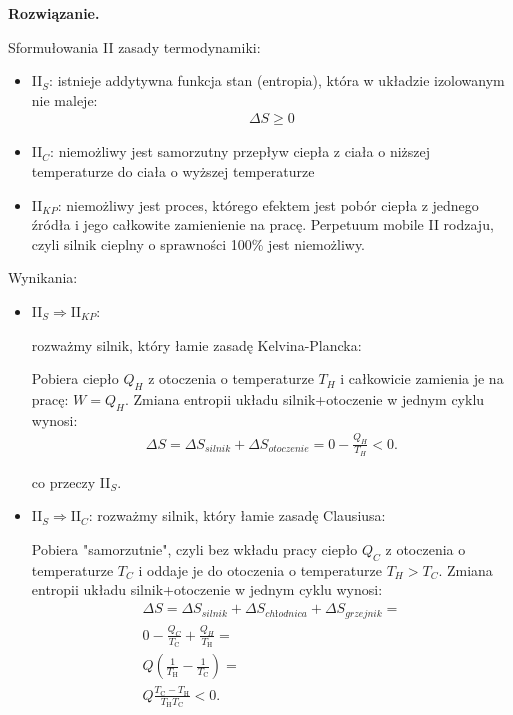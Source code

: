 \documentclass[11pt,a4paper]{article}
\newenvironment{solution}{\vspace{1cm} \par\textbf{Rozwiązanie.} \vspace{1cm}}{}
\begin{document}
\begin{solution}

  Sformułowania II zasady termodynamiki:
\begin{itemize}
  \item II$_{S}$: istnieje addytywna funkcja stan (entropia), 
  która w układzie izolowanym nie maleje:
  \begin{align*}
    \Delta S \geq 0
  \end{align*}
  \item II$_{C}$: niemożliwy jest samorzutny przepływ ciepła 
  z ciała o niższej temperaturze do ciała o wyższej temperaturze
  \item II$_{KP}$: niemożliwy jest proces, którego
      efektem jest pobór ciepła z jednego źródła i jego 
      całkowite zamienienie na pracę. Perpetuum mobile II rodzaju, 
      czyli silnik cieplny o sprawności 100\% jest niemożliwy.
\end{itemize}

\vskip 0.5cm
Wynikania:

\begin{itemize}
  \item II$_{S} \Rightarrow \text{II}_{KP}$:
  
  rozważmy silnik, który łamie zasadę Kelvina-Plancka: 

  \begin{center}
    \CarnotEngineDiagram[KPViolate]
  \end{center}

  Pobiera ciepło $Q_H$ z otoczenia o temperaturze $T_H$ i całkowicie zamienia je na pracę: $W = Q_H$.
  Zmiana entropii układu silnik+otoczenie w jednym cyklu wynosi:
  \begin{align*}
    \Delta S = \Delta S_{silnik} + \Delta S_{otoczenie} = 0 - \frac{Q_H}{T_H} < 0.
  \end{align*}
  
  co przeczy II$_{S}$.

  \newpage

  \item II$_{S} \Rightarrow \text{II}_{C}$:
  rozważmy silnik, który łamie zasadę Clausiusa:

 \begin{center}
    \CarnotEngineDiagram[CViolate]
  \end{center}

  Pobiera "samorzutnie", czyli bez wkładu pracy ciepło $Q_C$ z otoczenia 
  o temperaturze $T_C$ i oddaje je do otoczenia o temperaturze $T_H > T_C$.
  Zmiana entropii układu silnik+otoczenie w jednym cyklu wynosi:
  \begin{align*}
    \Delta S = \Delta S_{silnik} + \Delta S_{chłodnica} + \Delta S_{grzejnik} = \\
    0 - \frac{Q_C}{T_\text{C}} + \frac{Q_H}{T_\text{H}} = \\
    Q \left( \frac{1}{T_\text{H}} - \frac{1}{T_\text{C}} \right) = \\
    Q \frac{T_\text{C} - T_\text{H}}{T_\text{H} T_\text{C}} < 0.
  \end{align*}


\end{itemize}
\end{solution}
\end{document}
